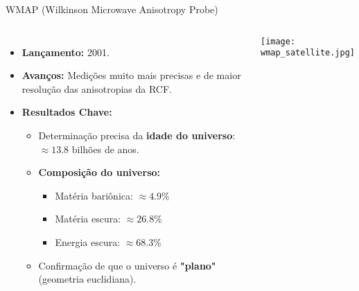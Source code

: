\documentclass{beamer}
\begin{document}
\begin{frame}{WMAP (Wilkinson Microwave Anisotropy Probe)}
    \begin{columns}
        \begin{itemize}
            \item \textbf{Lançamento:} 2001.
            \item \textbf{Avanços:} Medições muito mais precisas e de maior resolução das anisotropias da RCF.
            \item \textbf{Resultados Chave:}
            \begin{itemize}
                \item Determinação precisa da \textbf{idade do universo}: $\approx 13.8$ bilhões de anos.
                \item \textbf{Composição do universo:}
                \begin{itemize}
                    \item Matéria bariônica: $\approx 4.9\%$
                    \item Matéria escura: $\approx 26.8\%$
                    \item Energia escura: $\approx 68.3\%$
                \end{itemize}
                \item Confirmação de que o universo é \textbf{"plano"} (geometria euclidiana).
            \end{itemize}
        \end{itemize}
        \begin{center}
            \texttt{[image: wmap\_satellite.jpg]} %
            \tiny
        \end{center}
    \end{columns}
\end{frame}
\end{document}
